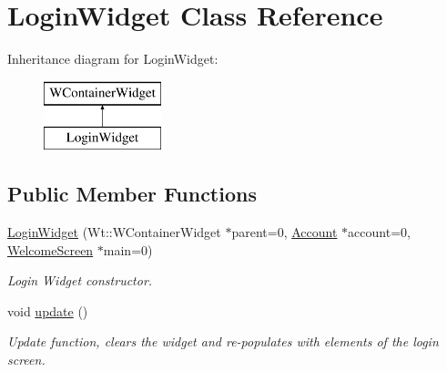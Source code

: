 \hypertarget{classLoginWidget}{}\section{Login\+Widget Class Reference}
\label{classLoginWidget}
Inheritance diagram for Login\+Widget\+:\begin{figure}[H]
\begin{center}
\leavevmode
\includegraphics[height=2.000000cm]{classLoginWidget}
\end{center}
\end{figure}
\subsection*{Public Member Functions}
\begin{DoxyCompactItemize}
\item 
\hyperlink{classLoginWidget_a52aff5acb69d4510b807a583ec03bfec}{Login\+Widget} (Wt\+::\+W\+Container\+Widget $\ast$parent=0, \hyperlink{classAccount}{Account} $\ast$account=0, \hyperlink{classWelcomeScreen}{Welcome\+Screen} $\ast$main=0)
\begin{DoxyCompactList}\small\item\em Login Widget constructor. \end{DoxyCompactList}\item 
void \hyperlink{classLoginWidget_acc7476881ad942e634beafdeb4bdb971}{update} ()
\begin{DoxyCompactList}\small\item\em Update function, clears the widget and re-\/populates with elements of the login screen. \end{DoxyCompactList}\end{DoxyCompactItemize}
